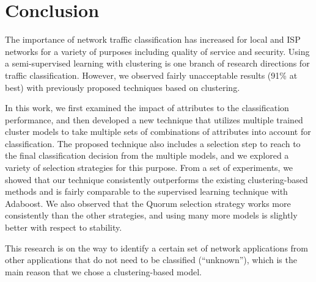 \documentclass[conference]{IEEEtran}
\begin{document}
\section{Conclusion}
\label{sec:conc}

The importance of network traffic classification has increased for local and ISP networks for a variety of purposes including quality of service and security. Using a semi-supervised learning with clustering is one branch of research directions for traffic classification.
However, we observed fairly unacceptable results (91\% at best) with previously proposed techniques based on clustering.

In this work, we first examined the impact of attributes to the classification performance, and then 
developed a new technique that utilizes multiple trained cluster models to take multiple sets of combinations of attributes into account for classification.
The proposed technique also includes a selection step to reach to the final classification decision from the multiple models, and we explored a variety of selection strategies for this purpose.
From a set of experiments, we showed that our technique consistently outperforms the existing clustering-based methods and is fairly comparable to the supervised learning technique with Adaboost.
We also observed that the Quorum selection strategy works more consistently than the other strategies, and using many more models is slightly better with respect to stability.

This research is on the way to identify a certain set of network applications from other applications that do not need to be classified (``unknown''), which is the main reason that we chose a clustering-based model.
  


%
%




\end{document}
